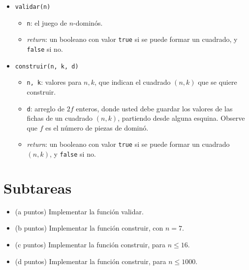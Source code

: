\documentclass{article}
\begin{document}
\begin{itemize}
 \item \verb+validar(n)+
 \begin{itemize}
  \item \verb+n+: el juego de $n$-dominós.
  \item \emph{return}: un booleano con valor \verb+true+ si se puede formar un cuadrado, y \verb+false+ si no.
 \end{itemize}

 \item \verb+construir(n, k, d)+
 \begin{itemize}
  \item \verb+n, k+: valores para $n,k$, que indican el cuadrado $(n,k)$ que se quiere construir.
  \item \verb+d+: arreglo de $2f$ enteros, donde usted debe guardar los valores de las fichas de un cuadrado $(n,k)$, partiendo desde alguna esquina. Observe que $f$ es el número de piezas de dominó. %
  \item \emph{return}: un booleano con valor \verb+true+ si se puede formar un cuadrado $(n,k)$, y \verb+false+ si no.
 \end{itemize}
\end{itemize}

\section*{Subtareas}
\begin{itemize}
  \item (a puntos) Implementar la función validar.
  \item (b puntos) Implementar la función construir, con $n=7$.
  \item (c puntos) Implementar la función construir, para $n \le 16$.
  \item (d puntos) Implementar la función construir, para $n \le 1000$.
\end{itemize}


\end{document}
